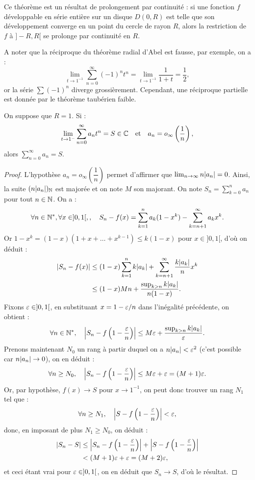 \begin{rmq}
Ce théorème est un résultat de prolongement par continuité : si une fonction $f$ développable en série entière sur un disque $D(0, R)$ 
est telle que son développement converge en un point du cercle de rayon $R$, alors la restriction de $f$ à $]-R, R[$ se prolonge par
continuité en $R$.
\end{rmq}

\begin{rmq}
A noter que la réciproque du théorème radial d'Abel est fausse, par exemple, on a :
\[ \lim_{t \to 1^{-1}} \sum_{n=0}^{\infty} (-1)^n t^n = \lim_{t \to 1^{-1}}  \dfrac1{1+t} = \dfrac12 , \]
or la série $\sum (-1)^n$ diverge grossièrement. Cependant, une réciproque partielle est donnée par le théorème taubérien faible.
\end{rmq}


\begin{thm}
On suppose que $R=1$. Si :
\[ \lim_{t \to 1^{-}} \sum_{n=0}^{\infty} a_n t^n = S \in \Cx \et a_n = o_{\infty} \left(\dfrac1{n} \right) , \]
alors $\sum_{n=0}^{\infty} a_n = S$.
\end{thm}

\begin{proof}
L'hypothèse $a_n = o_{\infty} \left(\dfrac1{n} \right)$ permet d'affirmer que $\lim_{n \to \infty} n \abs{a_n} = 0$. 
Ainsi, la suite $(n \abs{a_n})_\N$ est majorée et on note $M$ son majorant.
On note $S_n = \sum_{k=0}^n a_n$ pour tout $n \in \N$. On a :
\[ \forall n \in \Ne, \forall x \in ]0,1[,  , \quad S_n - f(x) = \sum_{k=1}^n a_k (1-x^k) - \sum_{k=n+1}^{\infty} a_k x^k . \]
Or $1-x^k = (1-x)(1+x+\dots + x^{k-1}) \leq k(1-x)$ pour $x \in ]0,1[$, d'où on déduit :
\begin{align*}
\abs{S_n - f(x)} & \leq (1-x) \sum_{k=1}^n k \abs{a_k} + \sum_{k=n+1}^{\infty} \dfrac{k \abs{a_k}}{n} x^k \\
& \leq (1-x) Mn + \dfrac{\sup_{k>n} k \abs{a_k}}{n(1-x)} .
\end{align*}
Fixons $\veps \in ]0,1[$, en substituant $x=1-\veps/n$ dans l'inégalité précédente, on obtient :
\[ \forall n \in \Ne, \quad \abs*{S_n - f \left (1 - \dfrac{\veps}{n} \right ) } \leq M \veps + \dfrac{\sup_{k>n} k \abs{a_k}}{\veps} . \]
Prenons maintenant $N_0$ un rang à partir duquel on a $n \abs{a_n} < \veps^2$ (c'est possible car $n \abs{a_n} \to 0$), on en déduit :
\[ \forall n \geq N_0, \quad \abs*{S_n - f \left (1 - \dfrac{\veps}{n} \right ) } \leq M \veps + \veps = (M+1) \veps . \]
Or, par hypothèse, $f(x) \to S$ pour $x \to 1^{-1}$, on peut donc trouver un rang $N_1$ tel que :
\[ \forall n \geq N_1, \quad \abs*{S - f \left (1 - \dfrac{\veps}{n} \right )} < \veps , \]
donc, en imposant de plus $N_1 \geq N_0$, on déduit :
\begin{align*}
\abs{S_n - S} & \leq \abs*{S_n - f \left (1 - \dfrac{\veps}{n} \right )} + \abs*{S - f \left (1 - \dfrac{\veps}{n} \right )} \\
& < (M+1) \veps + \veps = (M+2) \veps ,
\end{align*}
et ceci étant vrai pour $\veps \in ]0, 1[$, on en déduit que $S_n \to S$, d'où le résultat.
\end{proof}

